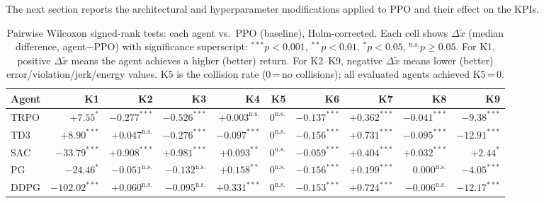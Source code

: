 \documentclass{ieeeaccess}
\begin{document}
The next section reports the architectural and hyperparameter modifications applied to PPO and their effect on the KPIs.

\begin{table}[!t]
\centering
\caption{Pairwise Wilcoxon signed-rank tests: each agent vs.\ PPO (baseline), Holm-corrected.
  Each cell shows $\Delta\tilde{x}$ (median difference, agent$-$PPO) with significance superscript:
  ${}^{***}p<0.001$, ${}^{**}p<0.01$, ${}^{*}p<0.05$, ${}^{\mathrm{n.s.}}p\geq0.05$.
  For K1, positive $\Delta\tilde{x}$ means the agent achieves a higher (better) return.
  For K2--K9, negative $\Delta\tilde{x}$ means lower (better) error/violation/jerk/energy values.
  K5 is the collision rate (0\,=\,no collisions); all evaluated agents achieved K5\,=\,0.}
\label{tab:significance}
\renewcommand{\arraystretch}{1.3}
\setlength{\tabcolsep}{5pt}
\footnotesize
\begin{tabular}{l *{9}{r}}
\toprule
\textbf{Agent} & \textbf{K1} & \textbf{K2} & \textbf{K3} & \textbf{K4} & \textbf{K5} & \textbf{K6} & \textbf{K7} & \textbf{K8} & \textbf{K9} \\
\midrule
TRPO & $+7.55^{*}$    & $-0.277^{***}$ & $-0.526^{***}$ & $+0.003^{\mathrm{n.s.}}$ & $0^{\mathrm{n.s.}}$    & $-0.137^{***}$ & $+0.362^{***}$ & $-0.041^{***}$ & $-9.38^{***}$  \\
TD3  & $+8.90^{***}$  & $+0.047^{\mathrm{n.s.}}$ & $-0.276^{***}$ & $-0.097^{***}$ & $0^{\mathrm{n.s.}}$    & $-0.156^{***}$ & $+0.731^{***}$ & $-0.095^{***}$ & $-12.91^{***}$ \\
SAC  & $-33.79^{***}$ & $+0.908^{***}$ & $+0.981^{***}$ & $+0.093^{**}$  & $0^{\mathrm{n.s.}}$   & $-0.059^{***}$ & $+0.404^{***}$ & $+0.032^{***}$ & $+2.44^{*}$    \\
PG   & $-24.46^{*}$   & $-0.051^{\mathrm{n.s.}}$ & $-0.132^{\mathrm{n.s.}}$ & $+0.158^{**}$  & $0^{\mathrm{n.s.}}$    & $-0.156^{***}$ & $+0.199^{***}$ & $0.000^{\mathrm{n.s.}}$  & $-4.05^{***}$  \\
DDPG & $-102.02^{***}$& $+0.060^{\mathrm{n.s.}}$ & $-0.095^{\mathrm{n.s.}}$ & $+0.331^{***}$ & $0^{\mathrm{n.s.}}$   & $-0.153^{***}$ & $+0.724^{***}$ & $-0.006^{\mathrm{n.s.}}$ & $-12.17^{***}$ \\
\bottomrule
\end{tabular}
\end{table}
\end{document}
